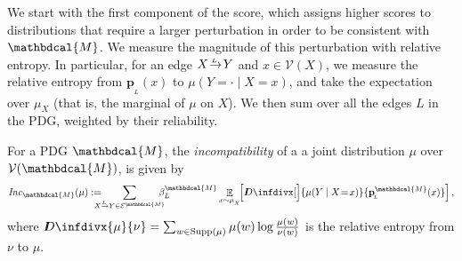 \documentclass[letterpaper]{article} %
\theoremstyle{plain}
\theoremstyle{definition}
\theoremstyle{remark}
\newcommand\vfull[1]{{\color{vfullcolor} #1}}
\renewcommand\vfull[1]{} %
\DeclareMathOperator*{\Ex}{\mathbb{E}} %
\newcommand\mat[1]{\mathbf{#1}}
\newcommand{\thickD}{I\mkern-8muD}
\newcommand{\kldiv}{\thickD\infdivx}
\def\sheq{\!=\!}
\newcommand{\bp}[1][L]{\mat{p}_{\!_{#1}\!}}
\newcommand{\V}{\mathcal V}
\newcommand{\N}{\mathcal N}
\newcommand{\Ed}{\mathcal E}
\newcommand{\pdgvars}[1][]{(\N#1, \Ed#1, \V#1, \mat p#1, \beta#1)}
\newcommand{\dg}[1]{\mathbdcal{#1}}
\newcommand\Inc{\mathit{Inc}}
\newcommand{\ed}[3]{#2\!%
  \overset{\smash{\mskip-5mu\raisebox{-1pt}{$\scriptscriptstyle
        #1$}}}{\rightarrow}\! #3}
\begin{document}
We start with the first component of the score, which assigns higher scores to
distributions that require a larger perturbation in order to be consistent with
$\dg M$.  
%
We measure the magnitude of this perturbation with relative entropy. In
particular, for an edge $\ed LXY$ and $x \in \V(X)$, we measure
the relative entropy from $\bp(x)$ to $\mu(Y \!= \cdot\mid X=x)$, and take the
expectation over $\mu_X$ (that is, the marginal of $\mu$ on $X$). We then sum
over all the edges $L$ in the PDG, weighted by their reliability.


\begin{defn}\label{def:inc}
    For a PDG $\dg M$, the \emph{incompatibility} of a
    a joint distribution $\mu$ over $\V(\dg M)$, is given by
    \[
	\Inc_{\dg M }( \mu) := 
		\!\!\!\!\!\!\sum_{\ed L{X\,}{\,Y} \in \Ed^{\dg M}} \!\!\!\!\!\beta_L^{\dg M} \Ex_{x \sim \mu_{_X}}\!\!
\left[\kldiv[\Big]{ \mu(Y \mid X \sheq x) }{\bp^{\dg M}(x) } \right] , \]
	where $\kldiv{\mu}{\nu} = \sum_{w \in \text{Supp($\mu$)}} \mu(w) \log\frac{\mu(w)}{\nu(w)}$ is the 
	relative entropy from $\nu$ to $\mu$.
\vfull{
	The \emph{inconsistency of PDG $\dg M = \pdgvars[]$}, denoted $\Inc(\dg M)$, is the minimum possible incompatibility of $\dg M$ with any distribution $\mu$,  
	\[ \Inc(\dg M) = \inf_{ \mu \in \Delta [W_{\cal V}]} \Inc_{\dg M}(\mu) . \]
}
\end{defn}
\end{document}
